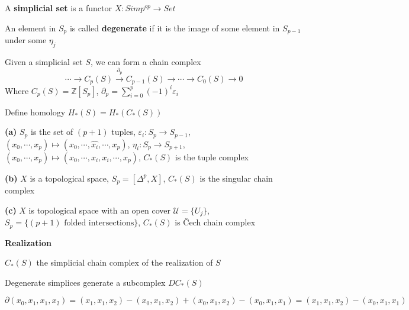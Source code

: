 \documentclass[../main.tex]{subfiles}
\begin{document}
\begin{definition}
A \textbf{simplicial set} is a functor $X:Simp^{op}\to Set$
\end{definition}

\begin{definition}
An element in $S_p$ is called \textbf{degenerate} if it is the image of some element in $S_{p-1}$ under some $\eta_j$
\end{definition}

\begin{definition}
Given a simplicial set $S$, we can form a chain complex
\[\cdots\to C_p(S)\xrightarrow{\partial_p}C_{p-1}(S)\to\cdots\to C_0(S)\to0\]
Where $C_p(S)=\mathbb Z[S_p]$, $\displaystyle\partial_p=\sum_{i=0}^p(-1)^i\varepsilon_i$ \par
Define homology $H_*(S)=H_*(C_*(S))$
\end{definition}

\begin{example}
\textbf{(a) }$S_p$ is the set of $(p+1)$ tuples, $\varepsilon_i:S_p\to S_{p-1}$, $(x_0,\cdots,x_p)\mapsto (x_0,\cdots,\widehat{x_i},\cdots,x_p)$, $\eta_i:S_p\to S_{p+1}$, $(x_0,\cdots,x_p)\mapsto(x_0,\cdots,x_i,x_i,\cdots,x_p)$, $C_*(S)$ is the tuple complex \par
\textbf{(b) }$X$ is a topological space, $S_p=[\Delta^p,X]$, $C_*(S)$ is the singular chain complex \par
\textbf{(c) }$X$ is topological space with an open cover $\mathcal U=\{U_j\}$, $S_p=\{(p+1)\text{ folded intersections}\}$, $C_*(S)$ is \v{C}ech chain complex
\end{example}

\begin{definition}
\textbf{Realization}
\end{definition}

\begin{lemma}
$C_*(S)$ the simplicial chain complex of the realization of $S$
\end{lemma}

\begin{lemma}
Degenerate simplices generate a subcomplex $DC_*(S)$ 
\end{lemma}

\begin{example}
$\partial(x_0,x_1,x_1,x_2)=(x_1,x_1,x_2)-(x_0,x_1,x_2)+(x_0,x_1,x_2)-(x_0,x_1,x_1)=(x_1,x_1,x_2)-(x_0,x_1,x_1)$
\end{example}
\end{document}
